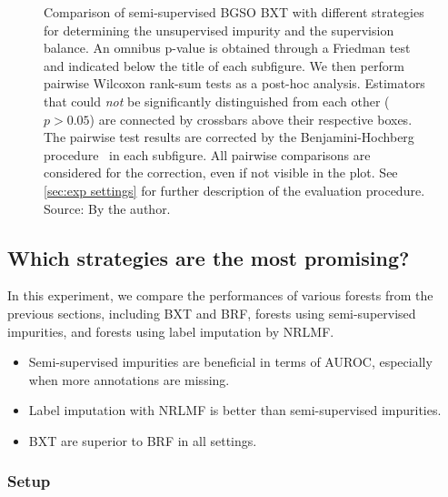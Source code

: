 \begin{figure}[tb]
    \caption{
        Comparison of semi-supervised BGSO BXT with different strategies for determining the unsupervised impurity and the supervision balance.
        An omnibus p-value is obtained through a Friedman test and indicated below the title of each subfigure.
        We then perform pairwise Wilcoxon rank-sum tests as a post-hoc analysis.
        Estimators that could \emph{not} be significantly distinguished from each other ($p > 0.05$) are connected by crossbars above their respective boxes. 
        The pairwise test results are corrected by the Benjamini-Hochberg procedure~\cite{benjamini1995controlling,haynes2013benjamini} in each subfigure. All pairwise comparisons are considered for the correction, even if not visible in the plot.
        See \autoref{sec:exp settings} for further description of the evaluation procedure. \newline Source: By the author.
    }
    \label{fig:ss_comparison}
\end{figure}


\subsection{Which strategies are the most promising?}
\label{sec:best_forests}

In this experiment, we compare the performances of various forests from the previous sections, including BXT and BRF, forests using semi-supervised impurities, and forests using label imputation by NRLMF.

\begin{mdframed}[frametitle={Key findings}]
    \begin{itemize}
        \item Semi-supervised impurities are beneficial in terms of AUROC, especially when more annotations are missing.  %
        \item Label imputation with NRLMF is better than semi-supervised impurities.
        \item BXT are superior to BRF in all settings.
    \end{itemize}
\end{mdframed}

\subsubsection{Setup}

